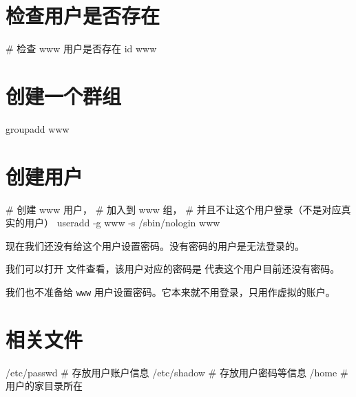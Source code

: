 \documentclass{mynote}
\begin{document}
\section{检查用户是否存在}

\begin{BashCode}
# 检查 www 用户是否存在
id www
\end{BashCode}

\section{创建一个群组}

\begin{BashCode}
groupadd www
\end{BashCode}

\section{创建用户}

\begin{BashCode}
# 创建 www 用户，
# 加入到 www 组，
# 并且不让这个用户登录（不是对应真实的用户）
useradd -g www -s /sbin/nologin www
\end{BashCode}

现在我们还没有给这个用户设置密码。没有密码的用户是无法登录的。

我们可以打开  文件查看，该用户对应的密码是 \BashCodeInline{!!} 代表这个用户目前还没有密码。


我们也不准备给 \texttt{www} 用户设置密码。它本来就不用登录，只用作虚拟的账户。


\section{相关文件}

\begin{BashCode}
/etc/passwd # 存放用户账户信息
/etc/shadow # 存放用户密码等信息
/home       # 用户的家目录所在
\end{BashCode}
\end{document}
